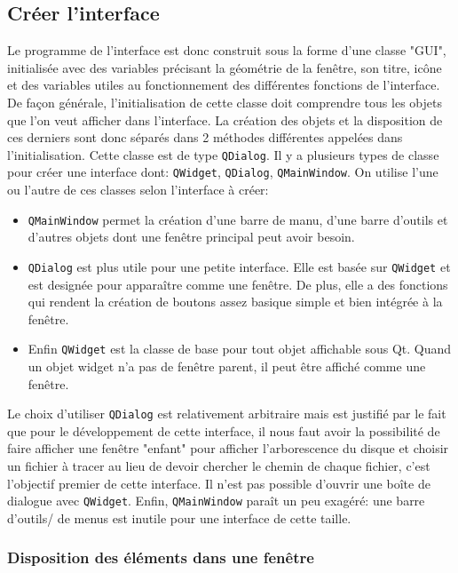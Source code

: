 \documentclass[a4paper, 11pt]{article}
\begin{document}
\subsection{Créer l'interface}

Le programme de l'interface est donc construit sous la forme d'une classe "GUI", initialisée avec des variables précisant la géométrie de la fenêtre, son titre, icône et des variables utiles au fonctionnement des différentes fonctions de l'interface. De façon générale, l'initialisation de cette classe doit comprendre tous les objets que l'on veut afficher dans l'interface. La création des objets et la disposition de ces derniers sont donc séparés dans 2 méthodes différentes appelées dans l'initialisation. Cette classe est de type \verb|QDialog|. Il y a plusieurs types de classe pour créer une interface dont: \verb|QWidget|, \verb|QDialog|, \verb|QMainWindow|. On utilise l'une ou l'autre de ces classes selon l'interface à créer: 
\begin{itemize}
	\item \verb|QMainWindow| permet la création d'une barre de manu, d'une barre d'outils et d'autres objets dont une fenêtre principal peut avoir besoin.
	\item \verb|QDialog| est plus utile pour une petite interface. Elle est basée sur \verb|QWidget| et est designée pour apparaître comme une fenêtre. De plus, elle a des fonctions qui rendent la création de boutons assez basique simple et bien intégrée à la fenêtre.
	\item Enfin \verb|QWidget| est la classe de base pour tout objet affichable sous Qt. Quand un objet widget n'a pas de fenêtre parent, il peut être affiché comme une fenêtre. 
\end{itemize}

Le choix d'utiliser \verb|QDialog| est relativement arbitraire mais est justifié par le fait que pour le développement de cette interface, il nous faut avoir la possibilité de faire afficher une fenêtre "enfant" pour afficher l'arborescence du disque et choisir un fichier à tracer au lieu de devoir chercher le chemin de chaque fichier, c'est l'objectif premier de cette interface. Il n'est pas possible d'ouvrir une boîte de dialogue avec \verb|QWidget|. Enfin, \verb|QMainWindow| paraît un peu exagéré: une barre d'outils/ de menus est inutile pour une interface de cette taille.

\subsubsection{Disposition des éléments dans une fenêtre}
\end{document}
